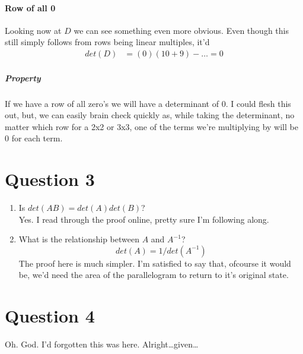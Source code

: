 \documentclass{article}
\begin{document}
      \paragraph{Row of all 0}
          Looking now at $D$ we can see something even more obvious.
          Even though this still simply follows from rows being linear multiples, it'd
          \begin{align*}
            det(D)&=(0)(10+9)-\dots=0
          \end{align*}
        \subparagraph{Property}
          If we have a row of all zero's we will have a determinant of 0.
          I could flesh this out, but, we can easily brain check quickly as,
          while taking the determinant, no matter which row for a 2x2 or 3x3,
          one of the terms we're multiplying by will be 0 for each term.
  \section{Question 3}
    \begin{enumerate}[label=(\alph*)]
      \item Is $det(AB)=det(A)det(B)$? \\
        Yes. I read through the proof online, pretty sure I'm following along.
      \item What is the relationship between $A$ and $A^{-1}$?
        \[det(A)=1/det(A^{-1})\]
        The proof here is much simpler. I'm satisfied to say that, ofcourse it would be,
        we'd need the area of the parallelogram to return to it's original state.
    \end{enumerate}
  \section{Question 4}
    Oh. God. I'd forgotten this was here. Alright\dots given\dots
\end{document}
